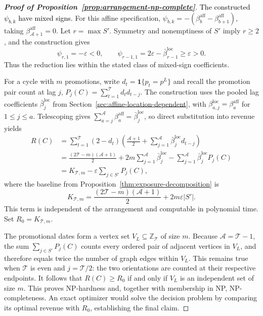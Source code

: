 \begin{proof}[\normalfont\bfseries Proof of Proposition~\ref{prop:arrangement-np-complete}]
\textcolor{black}{The constructed \(\psi_{b,k}\) have mixed signs.} For this affine specification, \(\psi_{b,k}=-(\beta_b^{\mathrm{aff}}-\beta_{b+1}^{\mathrm{aff}})\), taking \(\beta_{\mathcal A+1}^{\mathrm{aff}}=0\). Let \(r=\max S'\). Symmetry and nonemptiness of \(S'\) imply \(r\ge2\), and the construction gives
\[
    \psi_{r,1}=-\varepsilon<0,\qquad
    \psi_{r-1,1}=2\varepsilon-\bar\beta_{r-1}^{\mathrm{loc}}
    \ge\varepsilon>0.
\]
Thus the reduction lies within the stated class of mixed-sign coefficients.

For a cycle with \(m\) promotions, write \(d_t=\mathbf 1\{p_t=p^L\}\) and recall the promotion pair count at lag \(j\), \(P_j(C)=\sum_{t=1}^{\mathcal T}d_t d_{t-j}\). The construction uses the pooled lag coefficients \(\bar\beta_j^{\mathrm{loc}}\) from Section~\ref{sec:affine-location-dependent}, with \(\beta_{a,j}^{\mathrm{loc}}=\beta_a^{\mathrm{aff}}\) for \(1\le j\le a\). Telescoping gives \(\sum_{a=j}^{\mathcal A}\beta_a^{\mathrm{aff}}=\bar\beta_j^{\mathrm{loc}}\), so direct substitution into revenue yields
\begin{align*}
    R(C)
    &=\sum_{t=1}^{\mathcal T}(2-d_t)
      \left(\frac{\mathcal A+1}{2}
      +\sum_{j=1}^{\mathcal A}\bar\beta_j^{\mathrm{loc}}d_{t-j}\right)\\
    &=\frac{(2\mathcal T-m)(\mathcal A+1)}{2}
      +2m\sum_{j=1}^{\mathcal A}\bar\beta_j^{\mathrm{loc}}
      -\sum_{j=1}^{\mathcal A}\bar\beta_j^{\mathrm{loc}}P_j(C)\\
    &=K_{\mathcal T,m}
      -\varepsilon\sum_{j\in S'}P_j(C),
\end{align*}
where the baseline from Proposition~\ref{thm:exposure-decomposition} is
\[
    K_{\mathcal T,m}
    =\frac{(2\mathcal T-m)(\mathcal A+1)}{2}
      +2m\varepsilon|S'|.
\]
This term is independent of the arrangement and computable in polynomial time. Set \(R_0=K_{\mathcal T,m}\).

The promotional dates form a vertex set \(V_L\subseteq\mathbb Z_{\mathcal T}\) of size \(m\). Because \(\mathcal A=\mathcal T-1\), the sum \(\sum_{j\in S'}P_j(C)\) counts every ordered pair of adjacent vertices in \(V_L\), and therefore equals twice the number of graph edges within \(V_L\). This remains true when \(\mathcal T\) is even and \(j=\mathcal T/2\): the two orientations are counted at their respective endpoints. It follows that \(R(C)\ge R_0\) if and only if \(V_L\) is an independent set of size \(m\). This proves NP-hardness and, together with membership in NP, NP-completeness. An exact optimizer would solve the decision problem by comparing its optimal revenue with \(R_0\), establishing the final claim.
\end{proof}

